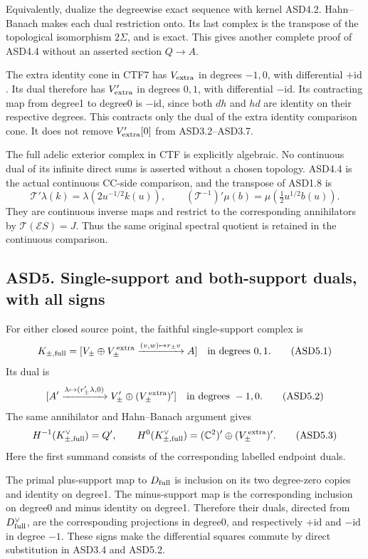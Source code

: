 Equivalently, dualize the degreewise exact sequence with kernel ASD4.2.
Hahn--Banach makes each dual restriction onto. Its last complex is the
transpose of the topological isomorphism \(2\Sigma\), and is exact. This
gives another complete proof of ASD4.4 without an asserted section
\(Q\to A\).

The extra identity cone in CTF7 has \(V_{\rm extra}\) in degrees
\(-1,0\), with differential \(+\mathrm{id}\). Its dual therefore has
\(V_{\rm extra}'\) in degrees \(0,1\), with differential
\(-\mathrm{id}\). Its contracting map from degree1 to degree0 is
\(-\mathrm{id}\), since both \(dh\) and \(hd\) are identity on their
respective degrees. This contracts only the dual of the extra identity
comparison cone. It does not remove \(V_{\rm extra}'[0]\) from
ASD3.2--ASD3.7.

The full adelic exterior complex in CTF is explicitly algebraic. No
continuous dual of its infinite direct sums is asserted without a chosen
topology. ASD4.4 is the actual continuous CC-side comparison, and the
transpose of ASD1.8 is \[
 \mathcal T'\lambda(k)=\lambda(2u^{-1/2}k(u)),
 \qquad
 (\mathcal T^{-1})'\mu(b)=\mu(\tfrac12u^{1/2}b(u)).
 \tag{ASD4.6}
\] They are continuous inverse maps and restrict to the corresponding
annihilators by \(\mathcal T(\mathcal ES)=J\). Thus the same original
spectral quotient is retained in the continuous comparison.

\subsection{ASD5. Single-support and both-support duals, with all
signs}\label{asd5.-single-support-and-both-support-duals-with-all-signs}

For either closed source point, the faithful single-support complex is
\[
 K_{\pm,{\rm full}}=[V_\pm\oplus V_\pm^{\,{\rm extra}}
       \xrightarrow{(v,w)\mapsto r_\pm v}A]
 \quad\text{in degrees }0,1.
 \tag{ASD5.1}
\] Its dual is \[
 [A'\xrightarrow{\lambda\mapsto(r_\pm'\lambda,0)}
       V_\pm'\oplus(V_\pm^{\,{\rm extra}})']
 \quad\text{in degrees }-1,0.
 \tag{ASD5.2}
\] The same annihilator and Hahn--Banach argument gives \[
 H^{-1}(K_{\pm,{\rm full}}^\vee)=Q',\qquad
 H^0(K_{\pm,{\rm full}}^\vee)
 =(\mathbb C^2)' \oplus(V_\pm^{\,{\rm extra}})'.
 \tag{ASD5.3}
\] Here the first summand consists of the corresponding labelled
endpoint duals.

The primal plus-support map to \(D_{\rm full}\) is inclusion on its two
degree-zero copies and identity on degree1. The minus-support map is the
corresponding inclusion on degree0 and minus identity on degree1.
Therefore their duals, directed from \(D_{\rm full}^\vee\), are the
corresponding projections in degree0, and respectively \(+\mathrm{id}\)
and \(-\mathrm{id}\) in degree \(-1\). These signs make the differential
squares commute by direct substitution in ASD3.4 and ASD5.2.

